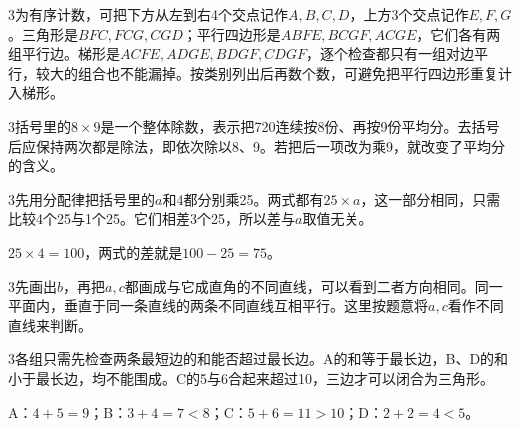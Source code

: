 \documentclass[multi=snippet,border={5bp 20bp 5bp 5bp}]{standalone}
\newenvironment{snippet}[3]{\begin{minipage}{#1bp}\color{answerred}\fontsize{#2}{#3}\selectfont\raggedright}{\end{minipage}}
\begin{document}
\begin{snippet}{505}{11.5}{14}\begin{multicols}{3}\raggedcolumns 为有序计数，可把下方从左到右4个交点记作\(A,\allowbreak B,\allowbreak C,\allowbreak D\)\allowbreak ，上方3个交点记作\(E,\allowbreak F,\allowbreak G\)\allowbreak 。三角形是\(BFC,\allowbreak FCG,\allowbreak CGD\)\allowbreak ；平行四边形是\(ABFE,\allowbreak BCGF,\allowbreak ACGE\)\allowbreak ，它们各有两组平行边。梯形是\(ACFE,\allowbreak ADGE,\allowbreak BDGF,\allowbreak CDGF\)\allowbreak ，逐个检查都只有一组对边平行，较大的组合也不能漏掉。按类别列出后再数个数，可避免把平行四边形重复计入梯形。\end{multicols}\end{snippet}
\begin{snippet}{505}{11.5}{14}\begin{multicols}{3}\raggedcolumns 括号里的\(8\times9\)\allowbreak 是一个整体除数，表示把720连续按8份、再按9份平均分。去括号后应保持两次都是除法，即依次除以8、9。若把后一项改为乘9，就改变了平均分的含义。\end{multicols}\end{snippet}
\begin{snippet}{505}{11.5}{14}\begin{multicols}{3}\raggedcolumns 先用分配律把括号里的\(a\)\allowbreak 和4都分别乘25。两式都有\(25\times a\)\allowbreak ，这一部分相同，只需比较4个25与1个25。它们相差3个25，所以差与\(a\)\allowbreak 取值无关。\par \(25\times4=100\)\allowbreak ，两式的差就是\(100-25=75\)\allowbreak 。\end{multicols}\end{snippet}
\begin{snippet}{505}{11.5}{14}\begin{multicols}{3}\raggedcolumns 先画出\(b\)\allowbreak ，再把\(a,\allowbreak c\)\allowbreak 都画成与它成直角的不同直线，可以看到二者方向相同。同一平面内，垂直于同一条直线的两条不同直线互相平行。这里按题意将\(a,\allowbreak c\)\allowbreak 看作不同直线来判断。\end{multicols}\end{snippet}
\begin{snippet}{505}{11.5}{14}\begin{multicols}{3}\raggedcolumns 各组只需先检查两条最短边的和能否超过最长边。A的和等于最长边，B、D的和小于最长边，均不能围成。C的5与6合起来超过10，三边才可以闭合为三角形。\par A：\(4+5=9\)\allowbreak ；B：\(3+4=7<8\)\allowbreak ；C：\(5+6=11>10\)\allowbreak ；D：\(2+2=4<5\)\allowbreak 。\end{multicols}\end{snippet}
\end{document}
